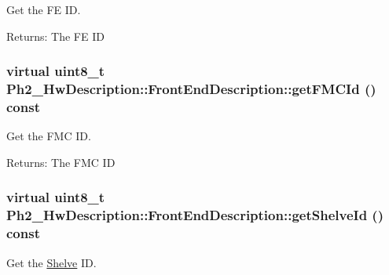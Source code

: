 Get the FE ID. 

\begin{Desc}
\item[Returns:]The FE ID \end{Desc}
\hypertarget{class_ph2___hw_description_1_1_front_end_description_d5af03f0adc80ee53511ea7e1dfeeea0}{
\subsubsection[getFMCId]{\setlength{\rightskip}{0pt plus 5cm}virtual uint8\_\-t Ph2\_\-Hw\-Description::Front\-End\-Description::get\-FMCId () const}}
\label{class_ph2___hw_description_1_1_front_end_description_d5af03f0adc80ee53511ea7e1dfeeea0}


Get the FMC ID. 

\begin{Desc}
\item[Returns:]The FMC ID \end{Desc}
\hypertarget{class_ph2___hw_description_1_1_front_end_description_d38bbaceaee52efe13614561059a0930}{
\subsubsection[getShelveId]{\setlength{\rightskip}{0pt plus 5cm}virtual uint8\_\-t Ph2\_\-Hw\-Description::Front\-End\-Description::get\-Shelve\-Id () const}}
\label{class_ph2___hw_description_1_1_front_end_description_d38bbaceaee52efe13614561059a0930}


Get the \hyperlink{class_ph2___hw_description_1_1_shelve}{Shelve} ID. 

